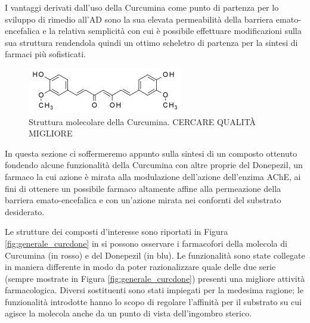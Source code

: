 \documentclass[a4paper, 12pt]{article}
\begin{document}
I vantaggi derivati dall'uso della Curcumina come punto di partenza per lo sviluppo di rimedio all'AD sono la sua elevata permeabilità della barriera emato-encefalica e la relativa semplicità con cui è possibile effettuare modificazioni sulla sua struttura rendendola quindi un ottimo scheletro di partenza per la sintesi di farmaci più sofisticati. \cite{jabir_cholinesterase_2018, jiang_traditional_2017}

\begin{figure}[H]
	\centering
	\includegraphics[width=.6\linewidth]{immagini/curcumina.png}
	\caption{Struttura molecolare della Curcumina. CERCARE QUALITÀ MIGLIORE}
	\label{fig:curcumina}
\end{figure}

In questa sezione ci soffermeremo appunto sulla sintesi di un composto ottenuto fondendo alcune funzionalità della Curcumina con altre proprie del Donepezil, un farmaco la cui azione è mirata alla modulazione dell'azione dell'enzima AChE, ai fini di ottenere un possibile farmaco altamente affine alla permeazione della barriera emato-encefalica e con un'azione mirata nei confornti del substrato desiderato.

Le strutture dei composti d'interesse sono riportati in Figura \ref{fig:generale_curcdone} in si possono osservare i farmacofori della molecola di Curcumina (in rosso) e del Donepezil (in blu). Le funzionalità sono state collegate in maniera differente in modo da poter razionalizzare quale delle due serie (sempre mostrate in Figura \ref{fig:generale_curcdone}) presenti una migliore attività farmacologica. Diversi sostituenti sono stati impiegati per la medesima ragione; le funzionalità introdotte hanno lo scopo di regolare l'affinità per il substrato su cui agisce la molecola anche da un punto di vista dell'ingombro sterico.
\end{document}
